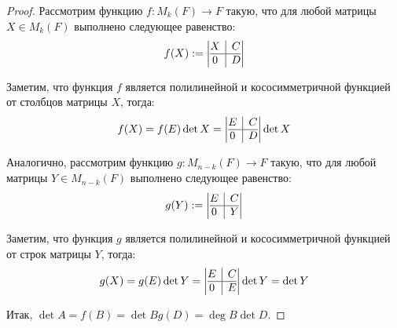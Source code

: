     \begin{proof}
    	Рассмотрим функцию $f : M_k(F) \rightarrow F$ такую, что для любой матрицы $X \in M_k(F)$ выполнено следующее равенство:
    	\[f(X) := \left|\begin{array}{@{}c|c@{}}
    	X & C\\
    	\hline
    	0 & D
    	\end{array}\right|\]
    	
    	Заметим, что функция $f$ является полилинейной и кососимметричной функцией от столбцов матрицы $X$, тогда:
    	\[f(X) = f(E)\det{X} = \left|\begin{array}{@{}c|c@{}}
    	E & C\\
    	\hline
    	0 & D
    	\end{array}\right|\det{X}\]
    	
    	Аналогично, рассмотрим функцию $g : M_{n - k}(F) \rightarrow F$ такую, что для любой матрицы $Y \in M_{n-k}(F)$ выполнено следующее равенство:
    	\[g(Y) := \left|\begin{array}{@{}c|c@{}}
    	E & C\\
    	\hline
    	0 & Y
    	\end{array}\right|\]
    	
    	Заметим, что функция $g$ является полилинейной и кососимметричной функцией от строк матрицы $Y$, тогда:
    	\[g(X) = g(E)\det{Y} = \left|\begin{array}{@{}c|c@{}}
    	E & C\\
    	\hline
    	0 & E
    	\end{array}\right|\det{Y} = \det{Y}\]
    	
    	Итак, $\det{A} = f(B) = \det{B}g(D) = \deg{B}\det{D}$.
    \end{proof}